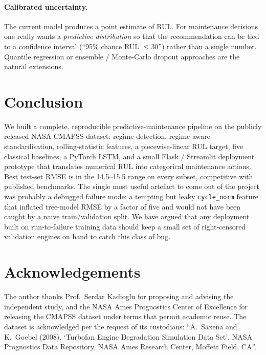 \documentclass[11pt,letterpaper]{article}
\begin{document}
\paragraph{Calibrated uncertainty.} The current model produces a point
estimate of RUL. For maintenance decisions one really wants a
\emph{predictive distribution} so that the recommendation can be tied
to a confidence interval (``95\% chance RUL $\le 30$'') rather than a
single number. Quantile regression \citep{koenker2005quantile} or
ensemble / Monte-Carlo dropout approaches \citep{gal2016dropout} are
the natural extensions.

\section{Conclusion}\label{sec:conclusion}
We built a complete, reproducible predictive-maintenance pipeline on
the publicly released NASA CMAPSS dataset: regime detection,
regime-aware standardisation, rolling-statistic features, a
piecewise-linear RUL target, five classical baselines, a PyTorch LSTM,
and a small Flask / Streamlit deployment prototype that translates
numerical RUL into categorical maintenance actions. Best test-set RMSE
is in the 14.5--15.5 range on every subset, competitive with published
benchmarks. The single most useful artefact to come out of the project
was probably a debugged failure mode: a tempting but leaky
\verb|cycle_norm| feature that inflated tree-model RMSE by a factor of
five and would not have been caught by a naive train/validation split.
We have argued that any deployment built on run-to-failure training
data should keep a small set of right-censored validation engines on
hand to catch this class of bug.

\section*{Acknowledgements}
The author thanks Prof.~Serdar Kadioglu for proposing and advising the
independent study, and the NASA Ames Prognostics Center of Excellence
for releasing the CMAPSS dataset under terms that permit academic
reuse. The dataset is acknowledged per the request of its custodians:
``A.~Saxena and K.~Goebel (2008). `Turbofan Engine Degradation
Simulation Data Set', NASA Prognostics Data Repository, NASA Ames
Research Center, Moffett Field, CA''.
\end{document}
